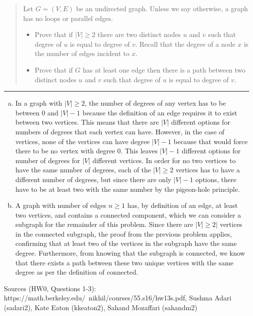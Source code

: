 \documentclass[11pt]{article}
\begin{document}



\begin{quote}
\item 
Let $G=(V,E)$ be an undirected graph. Unless we say otherwise, a graph has no loops or parallel edges.

\begin{itemize}
\item Prove that if $|V| \ge 2$ there are two distinct nodes $u$ and $v$ such that degree of $u$ is equal to degree of $v$.  Recall that the degree of a node $x$ is the number of edges incident to $x$.
\item Prove that if $G$ has at least one edge then there is a path between two distinct nodes $u$ and $v$ such that degree of $u$ is equal to degree of $v$.
\end{itemize}

\end{quote}
\hrule



\begin{solution}
\item 
\begin{enumerate}[(a)]
\item In a graph with $|V| \ge 2$, the number of degrees of any vertex has to be between 0 and $|V| - 1 $ because the definition of an edge requires it to exist between two vertices. This means that there are $|V|$ different options for numbers of degrees that each vertex can have. However, in the case of vertices, none of the vertices can have degree $|V| -1$ because that would force there to be no vertex with degree 0. 
This leaves $|V| - 1$ different options for number of degrees for $|V|$ different vertices. In order for no two vertices to have the same number of degrees, each of the $|V| \ge 2$ vertices has to have a different number of degrees, but since there are only $|V| - 1$ options, there have to be at least two with the same number by the pigeon-hole principle.
\item
A graph with number of edges $n \ge 1$ has, by definition of an edge, at least two vertices, and contains a connected component, which we can consider a subgraph for the remainder of this problem. Since there are $|V| \ge 2|$ vertices in the connected subgraph, the proof from the previous problem applies, confirming that at least two of the vertices in the subgraph have the same degree. Furthermore, from knowing that the subgraph is connected, we know that there exists a path between these two unique vertices with the same degree as per the definition of connected. 
\end{enumerate}
\vspace*{\fill} 
Sources (HW0, Questions 1-3): https://math.berkeley.edu/~nikhil/courses/55.s16/hw13s.pdf, Sushma Adari (sadari2), Kate Eaton (kkeaton2), Sahand Mozaffari (sahandm2)
\end{solution}
\end{document}
